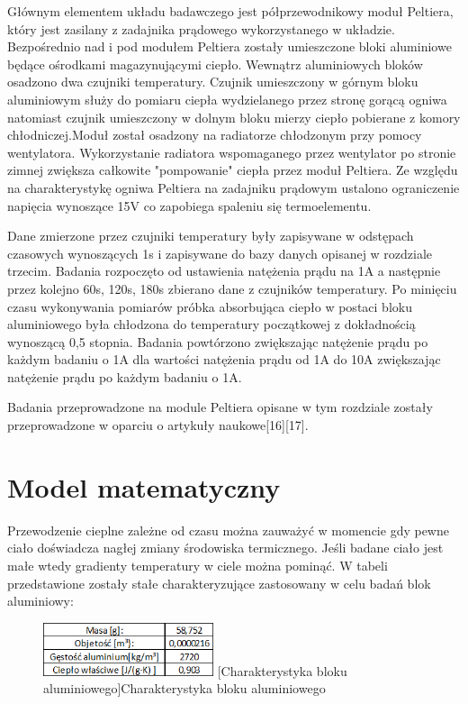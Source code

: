 \documentclass[oneside]{mgr}
\begin{document}
Głównym elementem układu badawczego jest półprzewodnikowy moduł Peltiera, który jest zasilany z zadajnika prądowego wykorzystanego w układzie. Bezpośrednio nad i pod modułem Peltiera zostały umieszczone bloki aluminiowe będące ośrodkami magazynującymi ciepło. Wewnątrz aluminiowych bloków osadzono dwa czujniki temperatury. Czujnik umieszczony w górnym bloku aluminiowym służy do pomiaru ciepła wydzielanego przez stronę gorącą ogniwa natomiast czujnik umieszczony w dolnym bloku mierzy ciepło pobierane z komory chłodniczej.Moduł został osadzony na radiatorze chłodzonym przy pomocy wentylatora. Wykorzystanie radiatora wspomaganego przez wentylator po stronie zimnej zwiększa całkowite "pompowanie" ciepła przez moduł Peltiera. Ze względu na charakterystykę ogniwa Peltiera na zadajniku prądowym ustalono ograniczenie napięcia wynoszące 15V co zapobiega spaleniu się termoelementu.

Dane zmierzone przez czujniki temperatury były zapisywane w odstępach czasowych wynoszących 1s i zapisywane do bazy danych opisanej w rozdziale trzecim. Badania rozpoczęto od ustawienia natężenia prądu na 1A a następnie przez kolejno 60s, 120s, 180s zbierano dane z czujników temperatury. Po minięciu czasu wykonywania pomiarów próbka absorbująca ciepło w postaci bloku aluminiowego była chłodzona do temperatury początkowej z dokładnością wynoszącą 0,5 stopnia. Badania powtórzono zwiększając natężenie prądu po każdym badaniu o 1A dla wartości natężenia prądu od 1A do 10A zwiększając natężenie prądu po każdym badaniu o 1A.


Badania przeprowadzone na module Peltiera opisane w tym rozdziale zostały przeprowadzone w oparciu o artykuły naukowe[16][17].
\newpage
\section{Model matematyczny}
Przewodzenie cieplne zależne od czasu można zauważyć w momencie gdy pewne ciało doświadcza nagłej zmiany środowiska termicznego. Jeśli badane ciało jest małe wtedy gradienty temperatury w ciele można pominąć. W tabeli przedstawione zostały stałe charakteryzujące zastosowany w celu badań blok aluminiowy:
\\
\begin{center}
\begin{figure}[h!]
    \centering
    \includegraphics[width=5cm]{Blok_aluminiowy_dane.png}
    [Charakterystyka bloku aluminiowego]{Charakterystyka bloku aluminiowego}
    \end{figure}
\end{center}
\end{document}
